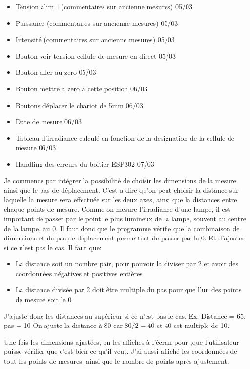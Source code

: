 \documentclass[12pt]{article}
\begin{document}
\begin{itemize}
	\item [ ] Tension alim ±(commentaires sur ancienne mesures)  05/03
	\item [ ] Puissance (commentaires sur ancienne mesures)  05/03
	\item [ ] Intensité (commentaires sur ancienne mesures)  05/03
	\item [ ] Bouton voir tension cellule de mesure en direct  05/03
	\item [ ] Bouton aller au zero  05/03
	\item [ ] Bouton mettre a zero a cette position  06/03
	\item [ ] Boutons déplacer le chariot de 5mm  06/03
	\item [ ] Date de mesure  06/03
	\item [ ] Tableau d'irradiance calculé en fonction de la designation de la cellule de mesure  06/03
	\item [ ] Handling des erreurs du boitier ESP302 07/03 
\end{itemize}

Je commence par intégrer la possibilité de choisir les dimensions de la mesure ainsi que le pas de déplacement.  
C'est a dire qu'on peut choisir la distance sur laquelle la mesure sera effectuée sur les deux axes, ainsi que la distances entre chaque points de mesure.  
Comme on mesure l'irradiance d'une lampe, il est important de passer par le point le plus lumineux de la lampe, souvent au centre de la lampe, au 0.  
Il faut donc que le programme vérifie que la combinaison de dimensions et de pas de déplacement permettent de passer par le 0.  
Et d'ajuster si ce n'est pas le cas.  
Il faut que:  
\begin{itemize}
	\item La distance soit un nombre pair, pour pouvoir la diviser par 2 et avoir des coordonnées négatives et positives entières  
	\item La distance divisée par 2 doit être multiple du pas pour que l'un des points de mesure soit le 0  
\end{itemize}


J'ajuste donc les distances au supérieur si ce n'est pas le cas. Ex:  
Distance = 65, pas = 10  
On ajuste la distance à 80 car $80/2 = 40$ et 40 est multiple de 10.  

Une fois les dimensions ajustées, on les affiches à l'écran pour ,que l'utilisateur puisse vérifier que c'est bien ce qu'il veut.  
J'ai aussi affiché les coordonnées de tout les points de mesures, ainsi que le nombre de points après ajustement.  
\end{document}

